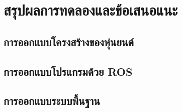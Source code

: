 
\chapter{สรุปผลการทดลองและข้อเสนอแนะ}

\section{การออกแบบโครงสร้างของหุ่นยนต์}


\clearpage
\section{การออกแบบโปรแกรมด้วย ROS}


\clearpage
\section{การออกแบบระบบพื้นฐาน}


\clearpage

